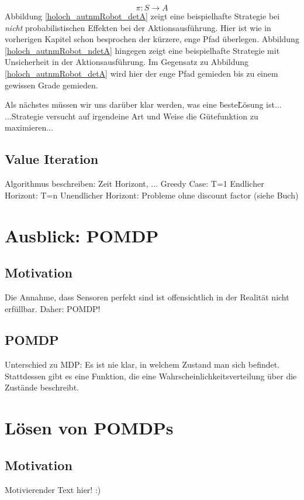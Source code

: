 \documentclass[a4paper]{IEEEtran}
\begin{document}
\begin{equation}
	\pi: S \rightarrow A
\end{equation}
Abbildung \ref{holoch_autnmRobot_detA} zeigt eine beispielhafte Strategie bei \emph{nicht} probabilistischen Effekten bei der Aktionsausführung. Hier ist wie in vorherigen Kapitel schon besprochen der kürzere, enge Pfad überlegen. Abbildung \ref{holoch_autnmRobot_ndetA} hingegen zeigt eine beispielhafte Strategie mit Unsicherheit in der Aktionsausführung. Im Gegensatz zu Abbildung \ref{holoch_autnmRobot_detA} wird hier der enge Pfad gemieden bis zu einem gewissen Grade gemieden.

Als nächstes müssen wir uns darüber klar werden, was eine \"beste\" Lösung ist...
...Strategie versucht auf irgendeine Art und Weise die Gütefunktion zu maximieren...

\subsection{Value Iteration} %
Algorithmus beschreiben: Zeit Horizont, ... %
Greedy Case: T=1
Endlicher Horizont: T=n
Unendlicher Horizont: Probleme ohne discount factor (siehe Buch)


\section{Ausblick: POMDP}
\subsection{Motivation}
Die Annahme, dass Sensoren perfekt sind ist offensichtlich in der Realität nicht erfüllbar. Daher: POMDP!

\subsection{POMDP}
Unterschied zu MDP: Es ist nie klar, in welchem Zustand man sich befindet. Stattdessen gibt es eine Funktion, die eine Wahrscheinlichkeitsverteilung über die Zustände beschreibt.


\section{Lösen von POMDPs}
\subsection{Motivation}
Motivierender Text hier! :)
\end{document}
